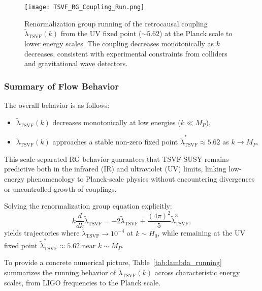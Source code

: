 \documentclass[twocolumn,superscriptaddress,floatfix]{revtex4-2}
\begin{document}
\begin{figure}[htbp]
\centering
\texttt{[image: TSVF\_RG\_Coupling\_Run.png]}
\caption{Renormalization group running of the retrocausal coupling \(\tilde{\lambda}_{\text{TSVF}}(k)\) from the UV fixed point (\(\sim 5.62\)) at the Planck scale to lower energy scales. The coupling decreases monotonically as \(k\) decreases, consistent with experimental constraints from colliders and gravitational wave detectors.}
\label{fig:lambda_running_plot}
\end{figure}

\subsubsection{Summary of Flow Behavior}
\label{subsubsec:flow_behavior}

The overall behavior is as follows:
\begin{itemize}
    \item \(\tilde{\lambda}_{\text{TSVF}}(k)\) decreases monotonically at low energies (\(k \ll M_P\)),
    \item \(\tilde{\lambda}_{\text{TSVF}}(k)\) approaches a stable non-zero fixed point \(\tilde{\lambda}_{\text{TSVF}}^* \approx 5.62\) as \(k \to M_P\).
\end{itemize}

This scale-separated RG behavior guarantees that TSVF-SUSY remains predictive both in the infrared (IR) and ultraviolet (UV) limits, linking low-energy phenomenology to Planck-scale physics without encountering divergences or uncontrolled growth of couplings.

\vspace{0.5em}

Solving the renormalization group equation explicitly:
\begin{equation}
k\frac{d}{dk}\tilde{\lambda}_{\text{TSVF}} = -2\tilde{\lambda}_{\text{TSVF}} + \frac{(4\pi)^2}{5}\tilde{\lambda}_{\text{TSVF}}^3,
\end{equation}
yields trajectories where \(\tilde{\lambda}_{\text{TSVF}} \to 10^{-4}\) at \(k \sim H_0\), while remaining at the UV fixed point \(\tilde{\lambda}_{\text{TSVF}}^* \approx 5.62\) near \(k \sim M_P\).

\vspace{0.5em}

To provide a concrete numerical picture, Table~\ref{tab:lambda_running} summarizes the running behavior of \(\tilde{\lambda}_{\text{TSVF}}(k)\) across characteristic energy scales, from LIGO frequencies to the Planck scale.
\end{document}
